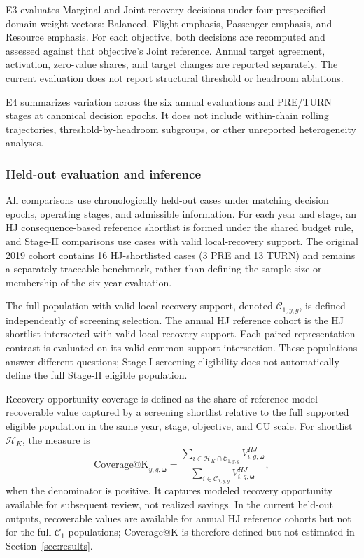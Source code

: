E3 evaluates Marginal and Joint recovery decisions under four prespecified domain-weight vectors: Balanced, Flight emphasis, Passenger emphasis, and Resource emphasis. For each objective, both decisions are recomputed and assessed against that objective's Joint reference. Annual target agreement, activation, zero-value shares, and target changes are reported separately. The current evaluation does not report structural threshold or headroom ablations.

E4 summarizes variation across the six annual evaluations and PRE/TURN stages at canonical decision epochs. It does not include within-chain rolling trajectories, threshold-by-headroom subgroups, or other unreported heterogeneity analyses.

\subsubsection{Held-out evaluation and inference}

All comparisons use chronologically held-out cases under matching decision epochs, operating stages, and admissible information. For each year and stage, an HJ consequence-based reference shortlist is formed under the shared budget rule, and Stage-II comparisons use cases with valid local-recovery support. The original 2019 cohort contains 16 HJ-shortlisted cases (3 PRE and 13 TURN) and remains a separately traceable benchmark, rather than defining the sample size or membership of the six-year evaluation.

The full population with valid local-recovery support, denoted $\mathcal C_{1,y,g}$, is defined independently of screening selection. The annual HJ reference cohort is the HJ shortlist intersected with valid local-recovery support. Each paired representation contrast is evaluated on its valid common-support intersection. These populations answer different questions; Stage-I screening eligibility does not automatically define the full Stage-II eligible population.

Recovery-opportunity coverage is defined as the share of reference model-recoverable value captured by a screening shortlist relative to the full supported eligible population in the same year, stage, objective, and CU scale. For shortlist $\mathcal H_K$, the measure is
\[
\mathrm{Coverage@K}_{y,g,\boldsymbol\omega}
=\frac{\displaystyle\sum_{i\in\mathcal H_K\cap\mathcal C_{1,y,g}}V_{i,g,\boldsymbol\omega}^{HJ}}
{\displaystyle\sum_{i\in\mathcal C_{1,y,g}}V_{i,g,\boldsymbol\omega}^{HJ}},
\]
when the denominator is positive. It captures modeled recovery opportunity available for subsequent review, not realized savings. In the current held-out outputs, recoverable values are available for annual HJ reference cohorts but not for the full $\mathcal C_1$ populations; Coverage@K is therefore defined but not estimated in Section~\ref{sec:results}.

